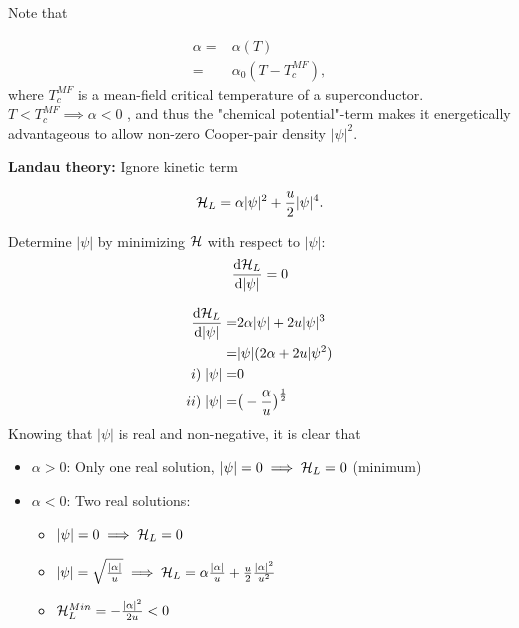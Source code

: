 Note that

\begin{equation}
\begin{aligned}
\alpha =& \alpha(T) \\
=& \alpha_0 (T - T_c^{MF}), 
\label{alpha}
\end{aligned}
\end{equation}
where $T_c^{MF}$ is a mean-field critical temperature of a superconductor. $T < T_c^{MF} \implies \alpha<0$ , and thus the "chemical potential"-term makes it energetically advantageous to allow non-zero Cooper-pair density $|\psi|^2$.

\textbf{Landau theory:} Ignore kinetic term 

\begin{equation}
\mathcal{H}_L = \alpha |\psi|^2 + \frac{u}{2} |\psi|^4.
\label{H_L}
\end{equation}

Determine $|\psi|$ by minimizing $\mathcal{H}$ with respect to $|\psi|$:
\begin{equation}
\frac{\dd{\mathcal{H}_L}}{\dd|\psi|} = 0
\end{equation}

\begin{equation}
\begin{aligned}
\frac{\dd{\mathcal{H}_L}}{\dd|\psi|}  =&  2\alpha |\psi| + 2u|\psi|^3 \\
=& |\psi| (2\alpha + 2u |\psi^2) \\
i)\;|\psi|  =& 0 \\
ii)\; |\psi|  =& \big( - \frac{\alpha}{u}\big)^\frac{1}{2}  
\label{alpha}
\end{aligned}
\end{equation}
Knowing that $|\psi| $ is real and non-negative, it is clear that

\begin{itemize}
\item $\alpha>0$: Only one real solution, $|\psi| = 0 \implies \mathcal{H}_L = 0$ (minimum)
\item  $\alpha<0$: Two real solutions: 
\begin{itemize}
\item$|\psi| = 0 \implies \mathcal{H}_L = 0$ \
\item$|\psi| = \sqrt{\frac{|\alpha|}{u}} \implies \mathcal{H}_L = \alpha \frac{|\alpha|}{u} + \frac{u}{2} \frac{|\alpha|^2}{u^2}$
\item $\mathcal{H}^{Min}_L = - \frac{|\alpha|^2}{2u} < 0$
\end{itemize}
\end{itemize}

